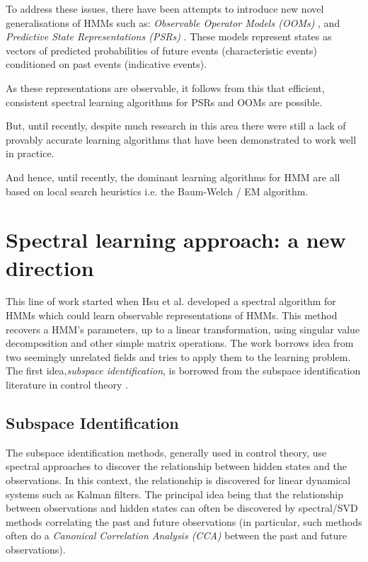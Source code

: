 To address these issues, there have been attempts to introduce new novel generalisations of HMMs such as: \textit{Observable Operator Models
(OOMs)} \cite{ref9}, and \textit{Predictive State Representations
(PSRs)} \cite{ref10}. These models represent states as vectors of predicted probabilities of future events (characteristic events) conditioned on past events (indicative
events). 

As these representations are observable, it follows from this that efficient, consistent spectral
learning algorithms for PSRs and OOMs are possible. 

But, until recently, despite much research in this area there were still a lack of provably accurate learning algorithms that have been demonstrated to work well in practice.

And hence, until recently, the dominant learning algorithms for HMM are all based on local search heuristics i.e. the Baum-Welch / EM algorithm.


\section{Spectral learning approach: a new direction}

This line of work started when Hsu et al.\cite{ref2}
developed a spectral algorithm for HMMs which could learn observable representations of HMMs. This method recovers a HMM’s parameters, up to a linear transformation, using singular value decomposition and other simple matrix operations.
\newline
\newline
The work borrows idea from two seemingly unrelated fields and tries to apply them to the learning problem.
\newline
\newline
The first idea,\textit{subspace identification}, is borrowed from the subspace identification literature in control theory \cite{ref12} \cite{ref13}. 
\newline
\subsection{Subspace Identification}

The subspace identification methods, generally used in control theory, use spectral approaches to discover the relationship between hidden states and the observations. In this context, the relationship is
discovered for linear dynamical systems such as Kalman filters. The principal idea being that the relationship between observations and hidden states can often be discovered by spectral/SVD methods correlating the past and future observations (in particular, such methods often do a \textit{Canonical
Correlation Analysis (CCA)}\cite{ref14} between the past and future observations).


